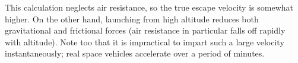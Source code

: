 \begin{remark}
	This calculation neglects air resistance, so the true escape velocity is somewhat
	higher. On the other hand, launching from high altitude reduces both gravitational and
	frictional forces (air resistance in particular falls off rapidly with altitude). Note
	too that it is impractical to impart such a large velocity instantaneously; real space
	vehicles accelerate over a period of minutes.
\end{remark}

